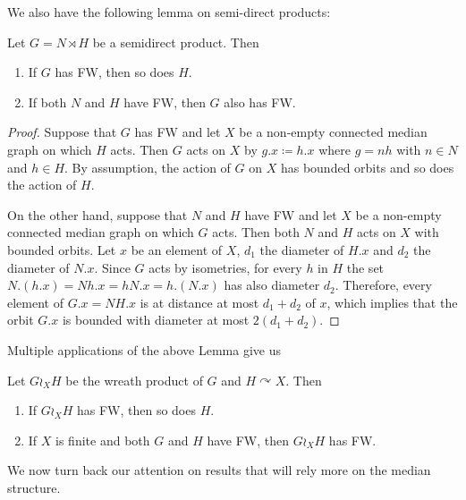 We also have the following lemma on semi-direct products:
\begin{lem}\label{Lemma:Semidirect}
Let $G=N\rtimes H$ be a semidirect product. Then
\begin{enumerate}
\item
If $G$ has FW, then so does $H$.
\item
If both $N$ and $H$ have FW, then $G$ also has FW.
\end{enumerate}
\end{lem}
\begin{proof}
Suppose that $G$ has FW and let $X$ be a non-empty connected median graph on which $H$ acts.
Then $G$ acts on $X$ by $g.x\coloneqq h.x$ where $g=nh$ with $n\in N$ and $h\in H$.
By assumption, the action of $G$ on $X$ has bounded orbits and so does the action of $H$.

On the other hand, suppose that $N$ and $H$ have FW and let $X$ be a non-empty connected median graph on which $G$ acts.
Then both $N$ and $H$ acts on $X$ with bounded orbits.
Let $x$ be an element of $X$, $d_1$ the diameter of $H.x$ and $d_2$ the diameter of $N.x$.
Since $G$ acts by isometries, for every $h$ in $H$ the set $N.(h.x)=Nh.x=hN.x=h.(N.x)$ has also diameter $d_2$.
Therefore, every element of $G.x=NH.x$ is at distance at most $d_1+d_2$ of $x$, which implies that the orbit $G.x$ is bounded with diameter at most $2(d_1+d_2)$.
\end{proof}
Multiple applications of the above Lemma give us
\begin{cor}\label{Cor:Wreath}
Let $G\wr_X H$ be the wreath product of $G$ and $H\curvearrowright X$.
Then
\begin{enumerate}
\item
If $G\wr_X H$ has FW, then so does $H$.
\item
If $X$ is finite and both $G$ and $H$ have FW, then $G\wr_X H$ has FW.
\end{enumerate}
\end{cor}







We now turn back our attention on results that will rely more on the median structure.

